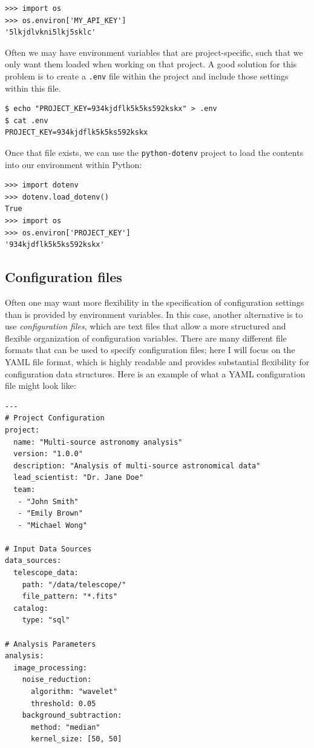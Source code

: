 \begin{lstlisting}[style=replshort]
>>> import os
>>> os.environ['MY_API_KEY']
'5lkjdlvkni5lkj5sklc'
\end{lstlisting}

Often we may have environment variables that are project-specific, such that we only want them loaded when working on that project.
A good solution for this problem is to create a \texttt{.env} file within the project and include those settings within this file.

\begin{lstlisting}[style=shellshort]
$ echo "PROJECT_KEY=934kjdflk5k5ks592kskx" > .env
$ cat .env
PROJECT_KEY=934kjdflk5k5ks592kskx
\end{lstlisting}

Once that file exists, we can use the \texttt{python-dotenv} project to load the contents into our environment within Python:

\begin{lstlisting}[style=repl]
>>> import dotenv
>>> dotenv.load_dotenv()
True
>>> import os
>>> os.environ['PROJECT_KEY']
'934kjdflk5k5ks592kskx'
\end{lstlisting}

\subsection{Configuration files}

Often one may want more flexibility in the specification of configuration settings than is provided by environment variables.
In this case, another alternative is to use \textit{configuration files}, which are text files that allow a more structured and flexible organization of configuration variables.
There are many different file formats that can be used to specify configuration files; here I will focus on the YAML file format, which is highly readable and provides substantial flexibility for configuration data structures.
Here is an example of what a YAML configuration file might look like:

\begin{lstlisting}[style=yaml]
---
# Project Configuration
project:
  name: "Multi-source astronomy analysis"
  version: "1.0.0"
  description: "Analysis of multi-source astronomical data"
  lead_scientist: "Dr. Jane Doe"
  team:
   - "John Smith"
   - "Emily Brown"
   - "Michael Wong"

# Input Data Sources
data_sources:
  telescope_data:
    path: "/data/telescope/"
    file_pattern: "*.fits"
  catalog:
    type: "sql"

# Analysis Parameters
analysis:
  image_processing:
    noise_reduction:
      algorithm: "wavelet"
      threshold: 0.05
    background_subtraction:
      method: "median"
      kernel_size: [50, 50]
\end{lstlisting}

